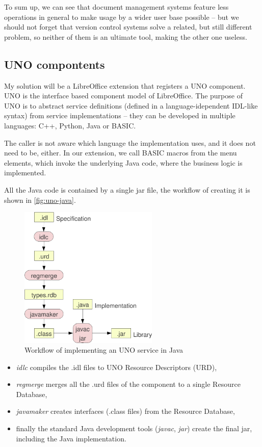 To sum up, we can see that document management systems feature less operations
in general to make usage by a wider user base possible -- but we should not
forget that version control systems solve a related, but still different
problem, so neither of them is an ultimate tool, making the other one useless.

\subsection{UNO compontents}

My solution will be a LibreOffice extension that registers a UNO \cite{uno}
component. UNO is the interface based component model of LibreOffice. The
purpose of UNO is to abstract service definitions (defined in a
language-idependent IDL-like syntax) from service implementations -- they can
be developed in multiple languages: C++, Python, Java or BASIC.

The caller is not aware which language the implementation uses, and it does not
need to be, either. In our extension, we call BASIC macros from the menu elements,
which invoke the underlying Java code, where the business logic is implemented.

All the Java code is contained by a single jar file, the workflow of creating
it is shown in \autoref{fig:uno-java}.

\begin{figure}[H]
\centering
\includegraphics[width=250px,keepaspectratio]{uno-java.pdf}
\caption{Workflow of implementing an UNO service in Java}
\label{fig:uno-java}
\end{figure}

\begin{itemize}
\item \emph{idlc} compiles the .idl files to UNO Resource Descriptors (URD),
\item \emph{regmerge} merges all the .urd files of the component to a single Resource Database,
\item \emph{javamaker} creates interfaces (.class files) from the Resource Database,
\item finally the standard Java development tools (\emph{javac}, \emph{jar})
create the final jar, including the Java implementation.
\end{itemize}

